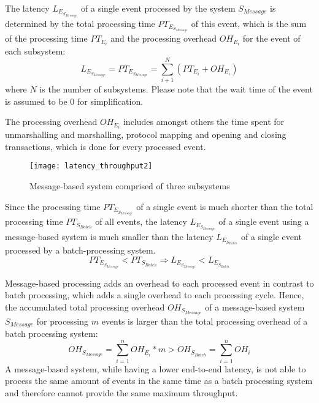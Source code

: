 The latency $L_{E_{S_{Message}}}$ of a single event processed by the system $S_{Message}$ is determined by the total processing time $PT_{E_{S_{Message}}}$ of this event, which is the sum of the processing time $PT_{E_i}$ and the processing overhead $OH_{E_{i}}$ for the event of each subsystem:
\begin{displaymath}
L_{E_{S_{Message}}} = PT_{E_{S_{Message}}} = \sum_{i+1}^N (PT_{E_i} + OH_{E_i})	
\end{displaymath}
where $N$ is the number of subsystems. Please note that the wait time of the event is assumed to be 0 for simplification.

The processing overhead $OH_{E_i}$ includes amongst others the time spent for unmarshalling and marshalling, protocol mapping and opening and closing transactions, which is done for every processed event.

\begin{figure}[htbp]
	\centering
	\texttt{[image: latency\_throughput2]}
	\caption{Message-based system comprised of three subsystems}
	\label{fig:message_based_latency}
\end{figure}

Since the processing time $PT_{E_{S_{Message}}}$ of a single event is much shorter than the total processing time $PT_{S_{Batch}}$ of all events, the latency $L_{E_{S_{Message}}}$ of a single event using a message-based system is much smaller than the latency $L_{E_{S_{Batch}}}$ of a single event processed by a batch-processing system.
\begin{displaymath}
PT_{E_{S_{Message}}} < PT_{S_{Batch}} \Rightarrow L_{E_{S_{Message}}} < L_{E_{S_{Batch}}}
\end{displaymath}

Message-based processing adds an overhead to each processed event in contrast to batch processing, which adds a single overhead to each processing cycle. Hence, the accumulated total processing overhead $OH_{S_{Message}}$ of a message-based system $S_{Message}$ for processing $m$ events is larger than the total processing overhead of a batch processing system:
\begin{displaymath}
OH_{S_{Message}} = \sum_{i=1}^n OH_{E_i} * m > OH_{S_{Batch}} = \sum_{i=1}^n OH_i
\end{displaymath}
A message-based system, while having a lower end-to-end latency, is not able to process the same amount of events in the same time as a batch processing system and therefore cannot provide the same maximum throughput.


